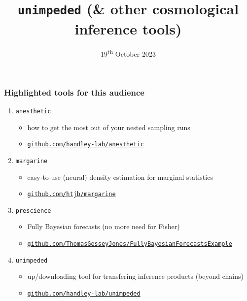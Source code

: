 \documentclass[aspectratio=169]{beamer}
\title{\texttt{unimpeded} (\& other cosmological inference tools)}
\date{19\textsuperscript{th} October 2023}
\begin{document}
\begin{frame}
    \titlepage
\end{frame}
\begin{frame}
    \frametitle{Highlighted tools for this audience}
    \begin{enumerate}
        \item \texttt{anesthetic} 
            \begin{itemize}
                \item how to get the most out of your nested sampling runs 
\item \texttt{\href{https://github.com/handley-lab/anesthetic}{github.com/handley-lab/anesthetic}}
            \end{itemize}
        \item \texttt{margarine} 
            \begin{itemize}
                \item easy-to-use (neural) density estimation for marginal statistics
                \item \texttt{\href{https://github.com/htjb/margarine}{github.com/htjb/margarine}} 
            \end{itemize}
        \item \texttt{prescience} 
            \begin{itemize}
                \item Fully Bayesian forecasts (no more need for Fisher)
                \item \texttt{\href{https://github.com/ThomasGesseyJones/FullyBayesianForecastsExample}{github.com/ThomasGesseyJones/FullyBayesianForecastsExample}} 
            \end{itemize}
        \item \texttt{unimpeded}
            \begin{itemize}
                \item up/downloading tool for transfering inference products (beyond chains)
                \item \texttt{\href{https://github.com/handley-lab/unimpeded}{github.com/handley-lab/unimpeded}} 
            \end{itemize}
    \end{enumerate}
\end{frame}
\end{document}
